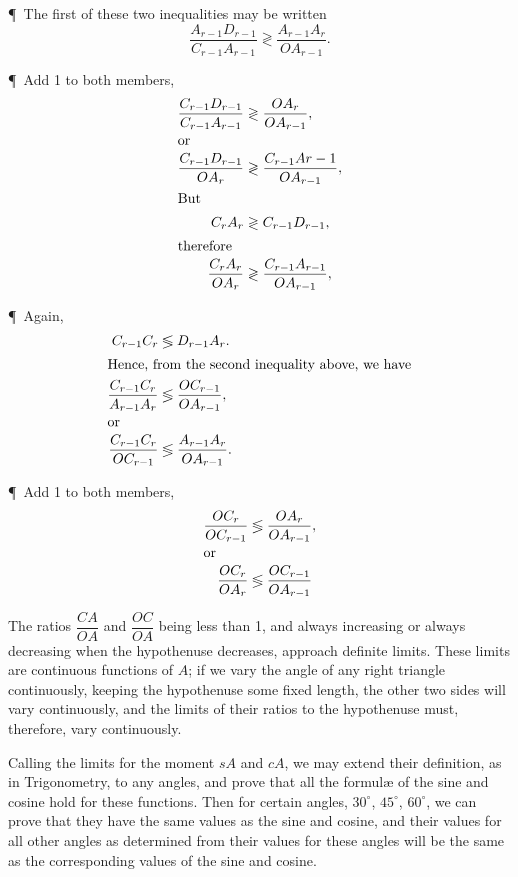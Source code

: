 \begin{description}
\P~The first of these two inequalities may be written
\begin{equation*}
  \frac{A_{r-1}D_{r-1}}{C_{r-1}A_{r-1}} \gtrless
  \frac{A_{r-1}A_r}{OA_{r-1}}.
\end{equation*}

\P~Add 1 to both members,
\begin{align*}
\frac{C_{r-1}D_{r-1}}{C_{r-1}A_{r-1}} &\gtrless
                                            \frac{OA_r}{OA_{r-1}}, \\
\intertext{or}
\frac{C_{r-1}D_{r-1}}{OA_r} &\gtrless
                                   \frac{C_{r-1}A{r-1}}{OA_{r-1}}, \\
\intertext{But}
C_rA_r &\gtrless C_{r-1}D_{r-1}, \\
\intertext{therefore}
\frac{C_rA_r}{OA_r} &\gtrless \frac{C_{r-1}A_{r-1}}{OA_{r-1}}, \\
\end{align*}

\P~Again,
\begin{align*}
C_{r-1}C_r &\lessgtr D_{r-1}A_r. \\
\intertext{Hence, from the second inequality above, we have}
\frac{C_{r-1}C_r}{A_{r-1}A_r} &\lessgtr \frac{OC_{r-1}}{OA_{r-1}}, \\
\intertext{or}
\frac{C_{r-1}C_r}{OC_{r-1}} &\lessgtr \frac{A_{r-1}A_r}{OA_{r-1}}. \\
\end{align*}

\P~Add 1 to both members,
\begin{align*}
\frac{OC_r}{OC_{r-1}} &\lessgtr \frac{OA_r}{OA_{r-1}}, \\
\intertext{or}
\frac{OC_r}{OA_r} &\lessgtr \frac{OC_{r-1}}{OA_{r-1}}
\end{align*}

The ratios $\dfrac{CA}{OA}$ and $\dfrac{OC}{OA}$ being less than 1,
and always increasing or always decreasing when the hypothenuse
decreases, approach definite limits. These limits are continuous
functions of $A$; if we vary the angle of any right triangle
continuously, keeping the hypothenuse some fixed length, the other
two sides will vary continuously, and the limits of their ratios to
the hypothenuse must, therefore, vary continuously.

Calling the limits for the moment $sA$ and $cA$, we may extend their
definition, as in Trigonometry, to any angles, and prove that all
the formulæ of the sine and cosine hold for these functions. Then
for certain angles, $30^\circ$, $45^\circ$, $60^\circ$, we can prove
that they have the same values as the sine and cosine, and their
values for all other angles as determined from their values for
these angles will be the same as the corresponding values of the
sine and cosine.


\end{description}
